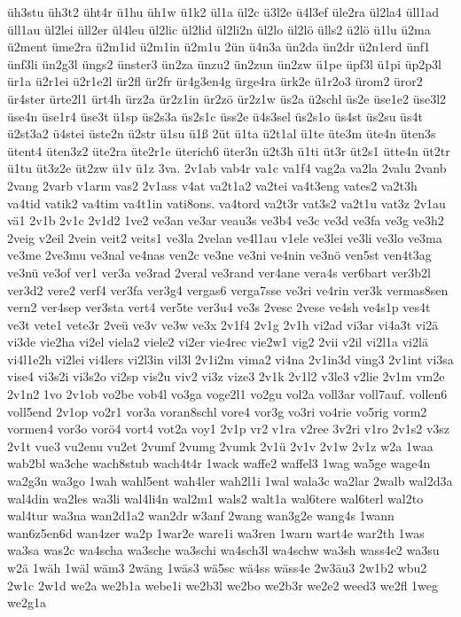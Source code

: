 {üh3stu
üh3t2
üht4r
ü1hu
üh1w
ü1k2
ül1a
ül2c
ü3l2e
ü4l3ef
üle2ra
ül2la4
üll1ad
üll1au
ül2lei
üll2er
ül4leu
ül2lic
ül2lid
ül2li2n
ül2lo
ül2lö
ülls2
ü2lö
ü1lu
ü2ma
ü2ment
üme2ra
ü2m1id
ü2m1in
ü2m1u
2ün
ü4n3a
ün2da
ün2dr
ü2n1erd
ünf1
ünf3li
ün2g3l
üngs2
ünster3
ün2za
ünzu2
ün2zun
ün2zw
ü1pe
üpf3l
ü1pi
üp2p3l
ür1a
ü2r1ei
ü2r1e2l
ür2fl
ür2fr
ür4g3en4g
ürge4ra
ürk2e
ü1r2o3
ürom2
üror2
ür4ster
ürte2l1
ürt4h
ürz2a
ür2z1in
ür2zö
ür2z1w
üs2a
ü2schl
üs2e
üse1e2
üse3l2
üse4n
üse1r4
üse3t
ü1sp
üs2s3a
üs2s1c
üss2e
ü4s3sel
üs2s1o
üs4st
üs2su
üs4t
ü2st3a2
ü4stei
üste2n
ü2str
ü1su
ü1ß
2üt
ü1ta
ü2t1al
ü1te
üte3m
üte4n
üten3s
ütent4
üten3z2
üte2ra
üte2r1e
üterich6
üter3n
ü2t3h
ü1ti
üt3r
üt2s1
ütte4n
üt2tr
ü1tu
üt3z2e
üt2zw
ü1v
ü1z
3va.
2v1ab
vab4r
va1c
va1f4
vag2a
va2la
2valu
2vanb
2vang
2varb
v1arm
vas2
2v1ass
v4at
va2t1a2
va2tei
va4t3eng
vates2
va2t3h
va4tid
vatik2
va4tim
va4t1in
vati8ons.
va4tord
va2t3r
vat3s2
va2t1u
vat3z
2v1au
vä1
2v1b
2v1c
2v1d2
1ve2
ve3an
ve3ar
veau3s
ve3b4
ve3c
ve3d
ve3fa
ve3g
ve3h2
2veig
v2eil
2vein
veit2
veits1
ve3la
2velan
ve4l1au
v1ele
ve3lei
ve3li
ve3lo
ve3ma
ve3me
2ve3mu
ve3nal
ve4nas
ven2c
ve3ne
ve3ni
ve4nin
ve3nö
ven5st
ven4t3ag
ve3nü
ve3of
ver1
ver3a
ve3rad
2veral
ve3rand
ver4ane
vera4s
ver6bart
ver3b2l
ver3d2
vere2
verf4
ver3fa
ver3g4
vergas6
verga7sse
ve3ri
ve4rin
ver3k
vermas8sen
vern2
ver4sep
ver3sta
vert4
ver5te
ver3u4
ve3s
2vesc
2vese
ve4sh
ve4s1p
ves4t
ve3t
vete1
vete3r
2veü
ve3v
ve3w
ve3x
2v1f4
2v1g
2v1h
vi2ad
vi3ar
vi4a3t
vi2ä
vi3de
vie2ha
vi2el
viela2
viele2
vi2er
vie4rec
vie2w1
vig2
2vii
v2il
vi2l1a
vi2lä
vi4l1e2h
vi2lei
vi4lers
vi2l3in
vil3l
2v1i2m
vima2
vi4na
2v1in3d
ving3
2v1int
vi3sa
vise4
vi3s2i
vi3s2o
vi2sp
vis2u
viv2
vi3z
vize3
2v1k
2v1l2
v3le3
v2lie
2v1m
vm2e
2v1n2
1vo
2v1ob
vo2be
vob4l
vo3ga
voge2l1
vo2gu
vol2a
voll3ar
voll7auf.
vollen6
voll5end
2v1op
vo2r1
vor3a
voran8schl
vore4
vor3g
vo3ri
vo4rie
vo5rig
vorm2
vormen4
vor3o
vorö4
vort4
vot2a
voy1
2v1p
vr2
v1ra
v2ree
3v2ri
v1ro
2v1s2
v3sz
2v1t
vue3
vu2enu
vu2et
2vumf
2vumg
2vumk
2v1ü
2v1v
2v1w
2v1z
w2a
1waa
wab2bl
wa3che
wach8stub
wach4t4r
1wack
waffe2
waffel3
1wag
wa5ge
wage4n
wa2g3n
wa3go
1wah
wahl5ent
wah4ler
wah2l1i
1wal
wala3c
wa2lar
2walb
wal2d3a
wal4din
wa2les
wa3li
wal4li4n
wal2m1
wals2
walt1a
wal6tere
wal6terl
wal2to
wal4tur
wa3na
wan2d1a2
wan2dr
w3anf
2wang
wan3g2e
wang4s
1wann
wan6z5en6d
wan4zer
wa2p
1war2e
ware1i
wa3ren
1warn
wart4e
war2th
1was
wa3sa
was2c
wa4scha
wa3sche
wa3schi
wa4sch3l
wa4schw
wa3sh
wass4e2
wa3su
w2ä
1wäh
1wäl
wäm3
2wäng
1wäs3
wä5sc
wä4ss
wäss4e
2w3äu3
2w1b2
wbu2
2w1c
2w1d
we2a
we2b1a
webe1i
we2b3l
we2bo
we2b3r
we2e2
weed3
we2fl
1weg
we2g1a
}
